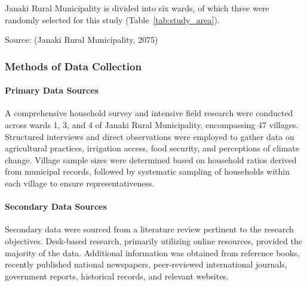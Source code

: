 Janaki Rural Municipality is divided into six wards, of which three were randomly selected for this study (Table~\ref{tab:study_area}). 

\begin{table}[h]
\centering
\caption{Study Area with elevation and coordinates}
\label{tab:study_area}
\end{table}

Source: (Janaki Rural Municipality, 2075)

\subsubsection{Methods of Data Collection}
\paragraph{Primary Data Sources}
A comprehensive household survey and intensive field research were conducted across wards 1, 3, and 4 of Janaki Rural Municipality, encompassing 47 villages. Structured interviews and direct observations were employed to gather data on agricultural practices, irrigation access, food security, and perceptions of climate change. Village sample sizes were determined based on household ratios derived from municipal records, followed by systematic sampling of households within each village to ensure representativeness.
\paragraph{Secondary Data Sources}
Secondary data were sourced from a literature review pertinent to the research objectives. Desk-based research, primarily utilizing online resources, provided the majority of the data. Additional information was obtained from reference books, recently published national newspapers, peer-reviewed international journals, government reports, historical records, and relevant websites.
